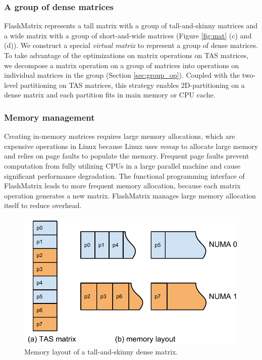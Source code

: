 \subsubsection{A group of dense matrices} \label{sec:mat_group}
FlashMatrix represents a tall matrix with a group of
tall-and-skinny matrices and a wide matrix with a group of short-and-wide
matrices (Figure \ref{fig:mat} (c) and (d)). We construct a special
\textit{virtual matrix} to represent
a group of dense matrices. To take advantage of the optimizations on matrix
operations on TAS matrices, we decompose a matrix operation on a group of
matrices into operations on individual matrices in the group (Section
\ref{sec:group_op}).
Coupled with the two-level partitioning on TAS matrices, this strategy enables
2D-partitioning on a dense matrix and each partition fits in main memory
or CPU cache.



\subsubsection{Memory management} \label{sec:mem}
Creating in-memory matrices requires large memory allocations, which are
expensive operations in Linux because Linux uses \textit{mmap} to allocate
large memory and relies on page faults to populate the memory. Frequent page
faults prevent computation from fully utilizing CPUs in a large parallel
machine and cause significant performance degradation. The functional
programming interface of FlashMatrix leads to more frequent memory allocation,
because each matrix operation generates a new matrix. 
FlashMatrix manages large memory allocation itself to reduce overhead.

\begin{figure}
	\centering
	\includegraphics[scale=0.5]{FlashMatrix_figs/matrix_mem.pdf}
	\caption{Memory layout of a tall-and-skinny dense matrix.}
	\label{fig:mat_mem}
\end{figure}

